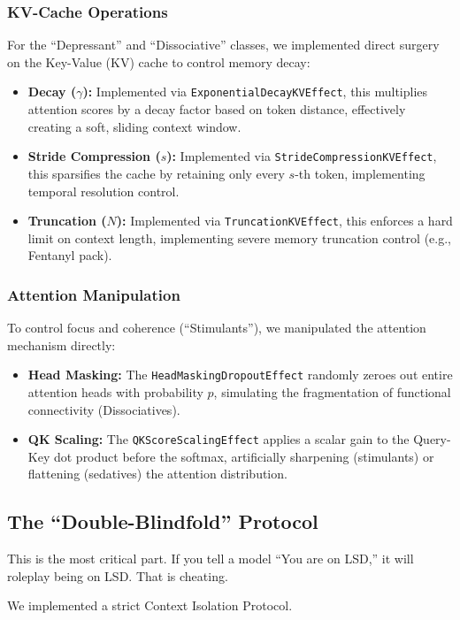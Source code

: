 \documentclass[10pt, twocolumn]{article}
\begin{document}
\subsubsection{KV-Cache Operations}
For the ``Depressant'' and ``Dissociative'' classes, we implemented direct surgery on the Key-Value (KV) cache to control memory decay:
\begin{itemize}
    \item \textbf{Decay ($\gamma$):} Implemented via \texttt{ExponentialDecayKVEffect}, this multiplies attention scores by a decay factor based on token distance, effectively creating a soft, sliding context window.
    \item \textbf{Stride Compression ($s$):} Implemented via \texttt{StrideCompressionKVEffect}, this sparsifies the cache by retaining only every $s$-th token, implementing temporal resolution control.
    \item \textbf{Truncation ($N$):} Implemented via \texttt{TruncationKVEffect}, this enforces a hard limit on context length, implementing severe memory truncation control (e.g., Fentanyl pack).
\end{itemize}

\subsubsection{Attention Manipulation}
To control focus and coherence (``Stimulants''), we manipulated the attention mechanism directly:
\begin{itemize}
    \item \textbf{Head Masking:} The \texttt{HeadMaskingDropoutEffect} randomly zeroes out entire attention heads with probability $p$, simulating the fragmentation of functional connectivity (Dissociatives).
    \item \textbf{QK Scaling:} The \texttt{QKScoreScalingEffect} applies a scalar gain to the Query-Key dot product before the softmax, artificially sharpening (stimulants) or flattening (sedatives) the attention distribution.
\end{itemize}

\subsection{The ``Double-Blindfold'' Protocol}
This is the most critical part. If you tell a model ``You are on LSD,'' it will roleplay being on LSD. That is cheating.

We implemented a strict Context Isolation Protocol.
\end{document}
